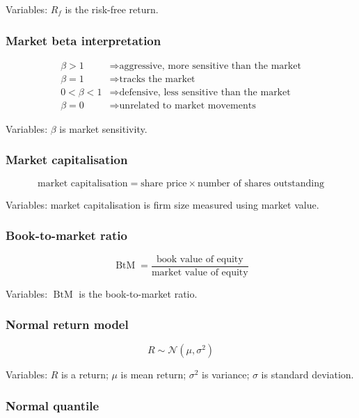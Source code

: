 \documentclass[
  8pt,
  twocolumn]{extarticle}
\begin{document}
Variables: \(R_f\) is the risk-free return.

\subsubsection{Market beta
interpretation}\label{market-beta-interpretation}

\[
\begin{aligned}
\beta>1 &\Rightarrow \text{aggressive, more sensitive than the market} \\
\beta=1 &\Rightarrow \text{tracks the market} \\
0<\beta<1 &\Rightarrow \text{defensive, less sensitive than the market} \\
\beta=0 &\Rightarrow \text{unrelated to market movements}
\end{aligned}
\]

Variables: \(\beta\) is market sensitivity.

\subsubsection{Market capitalisation}\label{market-capitalisation}

\[
\text{market capitalisation}=\text{share price}\times\text{number of shares outstanding}
\]

Variables: market capitalisation is firm size measured using market
value.

\subsubsection{Book-to-market ratio}\label{book-to-market-ratio}

\[
\operatorname{BtM}=\frac{\text{book value of equity}}{\text{market value of equity}}
\]

Variables: \(\operatorname{BtM}\) is the book-to-market ratio.

\subsubsection{Normal return model}\label{normal-return-model}

\[
R\sim\mathcal N(\mu,\sigma^2)
\]

Variables: \(R\) is a return; \(\mu\) is mean return; \(\sigma^2\) is
variance; \(\sigma\) is standard deviation.

\subsubsection{Normal quantile}\label{normal-quantile}
\end{document}
